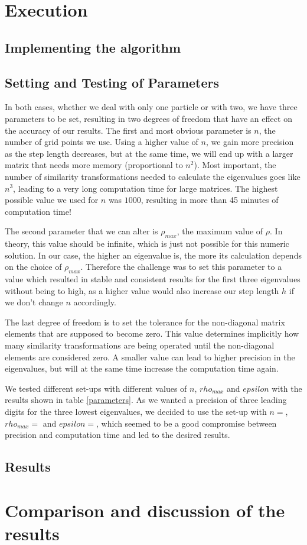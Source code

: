 \documentclass[10pt,a4paper]{article}
\begin{document}
\section{Execution}
\subsection{Implementing the algorithm}
\subsection{Setting and Testing of Parameters}
In both cases, whether we deal with only one particle or with two, we have three parameters to be set, resulting in two degrees of freedom that have an effect on the accuracy of our results. The first and most obvious parameter is $n$, the number of grid points we use. Using a higher value of $n$, we gain more precision as the step length decreases, but at the same time, we will end up with a larger matrix that needs more memory (proportional to $n^2$). Most important, the number of similarity transformations needed to calculate the eigenvalues goes like $n^3$, leading to a very long computation time for large matrices. The highest possible value we used for $n$ was $1000$, resulting in more than 45 minutes of computation time!

The second parameter that we can alter is $\rho_{max}$, the maximum value of $\rho$. In theory, this value should be infinite, which is just not possible for this numeric solution. In our case, the higher an eigenvalue is, the more its calculation depends on the choice of $\rho_{max}$. Therefore the challenge was to set this parameter to a value which resulted in stable and consistent results for the first three eigenvalues without being to high, as a higher value would also increase our step length $h$ if we don't change $n$ accordingly.

The last degree of freedom is to set the tolerance for the non-diagonal matrix elements that are supposed to become zero. This value determines implicitly how many similarity transformations are being operated until the non-diagonal elements are considered zero. A smaller value can lead to higher precision in the eigenvalues, but will at the same time increase the computation time again.

We tested different set-ups with different values of $n$, $rho_{max}$ and $epsilon$ with the results shown in table \ref{parameters}. As we wanted a precision of three leading digits for the three lowest eigenvalues, we decided to use the set-up with $n=$, $rho_{max}=$ and $epsilon=$, which seemed to be a good compromise between precision and computation time and led to the desired results.
\subsection{Results}
\section{Comparison and discussion of the results \label{Comparison and results}}
\end{document}

